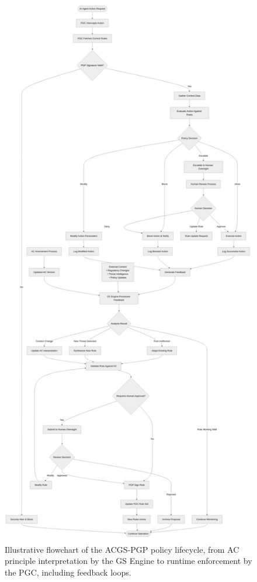\documentclass[sigconf,review,anonymous=false]{acmart} %
\begin{document}
\begin{figure}[t]
  \centering
  \includegraphics[width=0.9\columnwidth]{figures/figure2_policy_flowchart.png}
  \caption{Illustrative flowchart of the ACGS-PGP policy lifecycle, from AC principle interpretation by the GS Engine to runtime enforcement by the PGC, including feedback loops.}
  \label{fig:policy_flowchart}
\end{figure}
\end{document}
